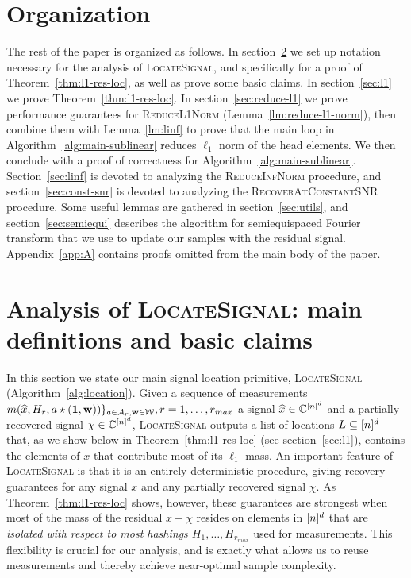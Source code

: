 \section{Organization}\label{sec:org}
The rest of the paper is organized as follows. In section~\ref{sec:l11} we set up notation necessary for the analysis of \textsc{LocateSignal}, and specifically for a proof of Theorem~\ref{thm:l1-res-loc}, as well as prove some basic claims. In section~\ref{sec:l1} we prove Theorem~\ref{thm:l1-res-loc}. In section~\ref{sec:reduce-l1} we prove performance guarantees for \textsc{ReduceL1Norm} (Lemma~\ref{lm:reduce-l1-norm}), then combine them with Lemma~\ref{lm:linf} to prove that the main loop in Algorithm~\ref{alg:main-sublinear} reduces $\ell_1$ norm of the head elements. We then conclude with a proof of correctness for Algorithm~\ref{alg:main-sublinear}. Section~\ref{sec:linf} is devoted to analyzing the \textsc{ReduceInfNorm} procedure, and section~\ref{sec:const-snr} is devoted to analyzing the \textsc{RecoverAtConstantSNR} procedure. Some useful lemmas are gathered in section~\ref{sec:utils}, and section~\ref{sec:semiequi} describes the algorithm for semiequispaced Fourier transform that we use to update our samples with the residual signal. Appendix~\ref{app:A} contains proofs omitted from the main body of the paper.



\section{Analysis of \textsc{LocateSignal}: main definitions and basic claims}\label{sec:l11}

In this section we state our main signal location primitive, \textsc{LocateSignal} (Algorithm~\ref{alg:location}). Given a sequence of measurements $m(\widehat{x}, H_r, a\star (\mathbf{1}, \mathbf{w}))\}_{a\in {\mathcal{A}}_r, \mathbf{w}\in \mathcal{W}}, r=1,\ldots, r_{max}$ a  signal $\widehat{x}\in \mathbb{C}^{[n]^d}$ and a partially recovered signal $\chi\in \mathbb{C}^{[n]^d}$, \textsc{LocateSignal} outputs a list of locations $L\subseteq {[n]^d}$ that, as we show below in Theorem~\ref{thm:l1-res-loc} (see section~\ref{sec:l1}), contains the elements of $x$ that contribute most of its $\ell_1$ mass. An important feature of \textsc{LocateSignal} is that it is an entirely deterministic procedure, giving recovery guarantees for any signal $x$ and any partially recovered signal $\chi$.  As Theorem~\ref{thm:l1-res-loc} shows, however, these guarantees are strongest when most of the mass of the residual $x-\chi$ resides on elements in ${[n]^d}$ that are {\em isolated with respect to most hashings $H_1,\ldots, H_{r_{max}}$} used for measurements. This flexibility is crucial for our analysis, and is exactly what allows us to reuse measurements and thereby achieve near-optimal sample complexity.

